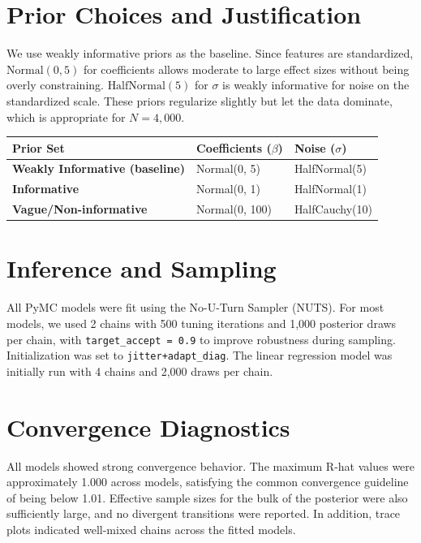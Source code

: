 \documentclass[11pt,a4paper]{article}
\begin{document}
\section{Prior Choices and Justification}
We use weakly informative priors as the baseline. Since features are standardized, $\text{Normal}(0, 5)$ for coefficients allows moderate to large effect sizes without being overly constraining. $\text{HalfNormal}(5)$ for $\sigma$ is weakly informative for noise on the standardized scale. These priors regularize slightly but let the data dominate, which is appropriate for $N=4,000$.

\begin{table}[H]
\centering
\renewcommand{\arraystretch}{1.3}
\begin{tabular}{lll}
\toprule
\textbf{Prior Set} & \textbf{Coefficients (\(\beta\))} & \textbf{Noise (\(\sigma\))} \\
\midrule
\textbf{Weakly Informative (baseline)} & Normal(0, 5) & HalfNormal(5) \\
\textbf{Informative} & Normal(0, 1) & HalfNormal(1) \\
\textbf{Vague/Non-informative} & Normal(0, 100) & HalfCauchy(10) \\
\bottomrule
\end{tabular}
\end{table}

\section{Inference and Sampling}

All PyMC models were fit using the No-U-Turn Sampler (NUTS). For most models, we used 2 chains with 500 tuning iterations and 1,000 posterior draws per chain, with \texttt{target\_accept = 0.9} to improve robustness during sampling. Initialization was set to \texttt{jitter+adapt\_diag}. The linear regression model was initially run with 4 chains and 2,000 draws per chain.

\section{Convergence Diagnostics}

All models showed strong convergence behavior. The maximum R-hat values were approximately 1.000 across models, satisfying the common convergence guideline of being below 1.01. Effective sample sizes for the bulk of the posterior were also sufficiently large, and no divergent transitions were reported. In addition, trace plots indicated well-mixed chains across the fitted models.
\end{document}
